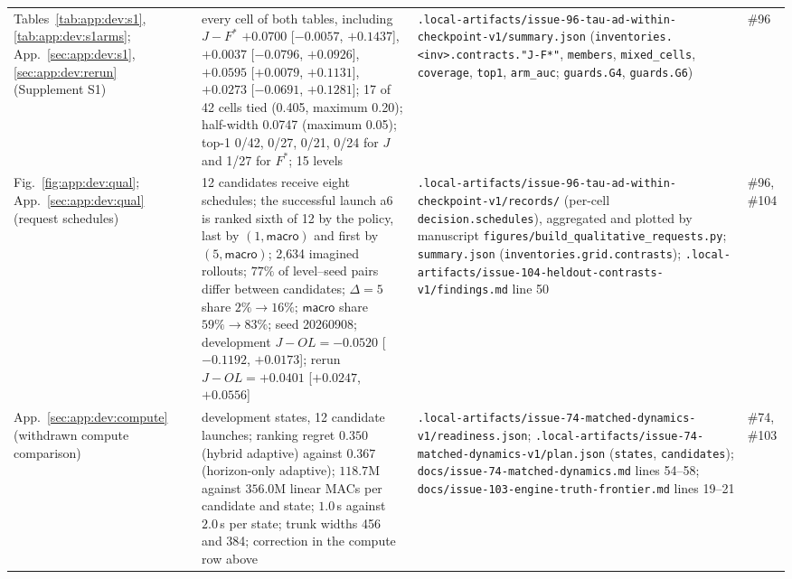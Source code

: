 {\begin{revblock}
\begin{longtable}{@{}>{\raggedright\arraybackslash}p{}>{\raggedright\arraybackslash}p{}>{\raggedright\arraybackslash}p{}>{\raggedright\arraybackslash}p{}@{}}
Tables~\ref{tab:app:dev:s1}, \ref{tab:app:dev:s1arms}; App.~\ref{sec:app:dev:s1}, \ref{sec:app:dev:rerun} (Supplement S1) & every cell of both tables, including $J-F^{*}$ $+0.0700$ [$-0.0057$, $+0.1437$], $+0.0037$ [$-0.0796$, $+0.0926$], $+0.0595$ [$+0.0079$, $+0.1131$], $+0.0273$ [$-0.0691$, $+0.1281$]; 17 of 42 cells tied (0.405, maximum 0.20); half-width 0.0747 (maximum 0.05); top-1 0/42, 0/27, 0/21, 0/24 for $J$ and 1/27 for $F^{*}$; 15 levels & \nolinkurl{.local-artifacts/issue-96-tau-ad-within-checkpoint-v1/summary.json} (\nolinkurl{inventories.<inv>.contracts."J-F*"}, \nolinkurl{members}, \nolinkurl{mixed_cells}, \nolinkurl{coverage}, \nolinkurl{top1}, \nolinkurl{arm_auc}; \nolinkurl{guards.G4}, \nolinkurl{guards.G6}) & \#96 \\
Fig.~\ref{fig:app:dev:qual}; App.~\ref{sec:app:dev:qual} (request schedules) & {\color{black}12 candidates receive eight schedules; the successful launch a6 is ranked sixth of 12 by the policy, last by $(1,\textsf{macro})$ and first by $(5,\textsf{macro})$; 2{,}634 imagined rollouts; $77\%$ of level--seed pairs differ between candidates; $\Delta=5$ share $2\%\to16\%$; $\textsf{macro}$ share $59\%\to83\%$}; seed 20260908; development $J-OL=-0.0520$ [$-0.1192$, $+0.0173$]; rerun $J-OL=+0.0401$ [$+0.0247$, $+0.0556$] & {\color{black}\nolinkurl{.local-artifacts/issue-96-tau-ad-within-checkpoint-v1/records/} (per-cell \texttt{decision.schedules}), aggregated and plotted by} manuscript {\color{black}\nolinkurl{figures/build_qualitative_requests.py}}; \nolinkurl{summary.json} (\nolinkurl{inventories.grid.contrasts}); \nolinkurl{.local-artifacts/issue-104-heldout-contrasts-v1/findings.md} line 50 & {\color{black}\#96}, \#104 \\
App.~\ref{sec:app:dev:compute} (withdrawn compute comparison) & 200 development states, 12 candidate launches; {\color{black}ranking regret $0.350$ (hybrid adaptive) against $0.367$ (horizon-only adaptive); $118.7$M against $356.0$M linear MACs per candidate and state; $1.0$\,s against $2.0$\,s per state}; trunk widths 456 and 384; correction in the compute row above & {\color{black}\nolinkurl{.local-artifacts/issue-74-matched-dynamics-v1/readiness.json}}; \nolinkurl{.local-artifacts/issue-74-matched-dynamics-v1/plan.json} (\texttt{states}, \texttt{candidates}); \nolinkurl{docs/issue-74-matched-dynamics.md} lines 54--58; \nolinkurl{docs/issue-103-engine-truth-frontier.md} lines 19--21 & {\color{black}\#74}, \#103 \\

\end{longtable}
\end{revblock}}
